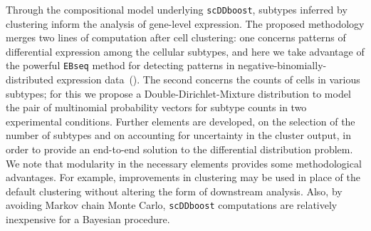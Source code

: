 \documentclass[aoas,preprint]{imsart}
\begin{document}
Through the compositional model underlying \verb+scDDboost+, subtypes inferred by clustering 
inform the analysis of gene-level expression.  The proposed methodology merges two lines of computation
after cell clustering: one concerns patterns of differential expression among 
the cellular subtypes, and here we take advantage of the powerful \verb+EBseq+ method for detecting
patterns in negative-binomially-distributed expression data~(\cite{ref:Leng}).  The second concerns 
the counts of cells in various subtypes; for this we propose a Double-Dirichlet-Mixture distribution
to model the pair of multinomial probability vectors for subtype counts in two experimental conditions.
Further elements are developed, on the selection of the number of subtypes and on accounting for uncertainty in the cluster output,  in order to provide an end-to-end solution to the differential distribution
problem.  We note that modularity in the necessary elements provides some methodological advantages. For example,
improvements in clustering may be used in place of the default clustering
without altering the form of downstream analysis.  Also, by avoiding Markov chain Monte Carlo,
\verb+scDDboost+ computations are relatively inexpensive for a Bayesian procedure.
\end{document}
